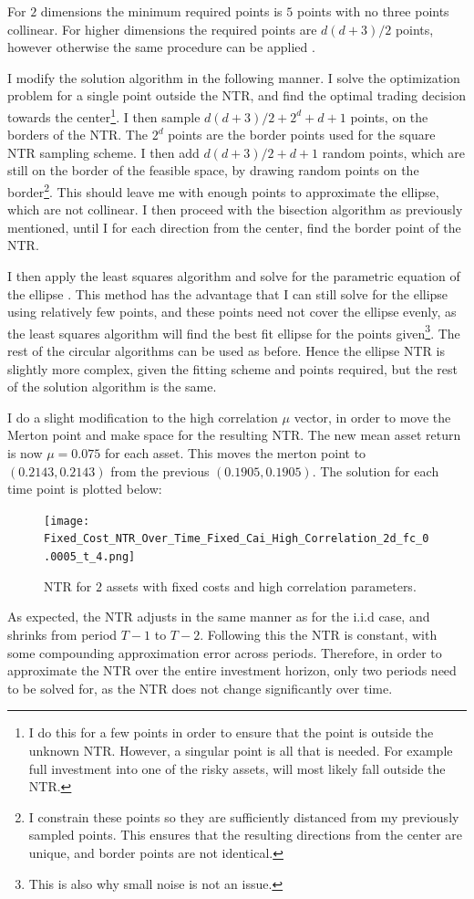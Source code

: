 \documentclass[11pt]{article}
\begin{document}
For $2$ dimensions the minimum required points is $5$ points with no three points collinear. For higher dimensions the required points are $d(d+3)/2$ points,
however otherwise the same procedure can be applied \autocite{bertoni2010multi}.

I modify the solution algorithm in the following manner.
I solve the optimization problem for a single point outside the NTR, and find the optimal trading decision 
towards the center\footnote{I do this for a few points in order to ensure that the point is outside the unknown NTR. However, a singular point is all that is needed. 
For example full investment into one of the risky assets, will most likely fall outside the NTR.}.
I then sample $d(d+3)/2+2^{d}+d+1$ points, on the borders of the NTR. The $2^{d}$ points are the border points used for the square \ac{NTR} sampling scheme.
I then add $d(d+3)/2+d+1$ random points, which are still on the border of the feasible space, 
by drawing random points on the border\footnote{I constrain these points so they are sufficiently distanced from my previously sampled points. This ensures that the resulting directions from the center are unique, and border points are not identical.}.
This should leave me with enough points to approximate the ellipse, which are not collinear.
I then proceed with the bisection algorithm as previously mentioned, until I for each direction from the center, find the border point of the \ac{NTR}.

I then apply the least squares algorithm and solve for the parametric equation of the ellipse \autocites{gander1994least}{bertoni2010multi}. 
This method has the advantage that I can still solve for the ellipse using relatively few points,
and these points need not cover the ellipse evenly, as the least squares algorithm will find the best fit ellipse for the points given\footnote{This is also why small noise is not an issue.}. 
The rest of the circular algorithms can be used as before. Hence the ellipse NTR is slightly more complex, given the fitting scheme and points required,
but the rest of the solution algorithm is the same. 

I do a slight modification to the high correlation $\mu$ vector, in order to move the Merton point and make space for the resulting NTR.
The new mean asset return is now $\mu = 0.075$ for each asset. This moves the merton point to $(0.2143 , 0.2143)$ from the previous $(0.1905, 0.1905)$.
The solution for each time point is plotted below:
\begin{figure}[!ht]
    \centering
    \texttt{[image: Fixed\_Cost\_NTR\_Over\_Time\_Fixed\_Cai\_High\_Correlation\_2d\_fc\_0.0005\_t\_4.png]}
    \caption{NTR for $2$ assets with fixed costs and high correlation parameters.}
    \label{fig: NTR_Fixed_3d_high_correlation_over_time}
\end{figure}
As expected, the NTR adjusts in the same manner as for the i.i.d case, and shrinks from period $T-1$ to $T-2$. Following this the NTR is constant,
with some compounding approximation error across periods.
Therefore, in order to approximate the NTR over the entire investment horizon, only two periods need to be solved for, as the NTR does not change significantly over time.
\end{document}
